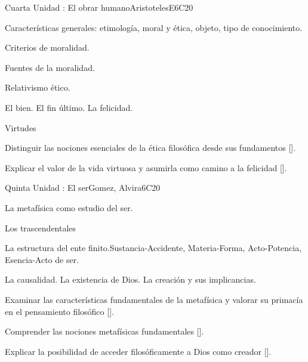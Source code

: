\begin{syllabus}
\begin{unit}{}{Cuarta Unidad : El obrar humano}{AristotelesE}{6}{C20}
\begin{topics}
	\item Características generales: etimología, moral y ética, objeto, tipo de conocimiento.
	\item Criterios de moralidad.
	\item Fuentes de la moralidad.
	\item Relativismo ético.
	\item El bien. El fin último. La felicidad.
	\item Virtudes
\end{topics}
\begin{learningoutcomes}
	\item Distinguir las nociones esenciales de la ética filosófica desde sus fundamentos [\Usage].
    \item Explicar el valor de la vida virtuosa y asumirla como camino a la felicidad [\Usage].
\end{learningoutcomes}
\end{unit}

\begin{unit}{}{Quinta Unidad : El ser}{Gomez, Alvira}{6}{C20}
\begin{topics}
	\item La metafísica como estudio del ser.
	\item Los trascendentales
	\item La estructura del ente finito.Sustancia-Accidente, Materia-Forma, Acto-Potencia, Esencia-Acto de ser.
	\item La causalidad. La existencia de Dios. La creación y sus implicancias.
\end{topics}
\begin{learningoutcomes}
	\item Examinar las características fundamentales de la metafísica y valorar su primacía en el pensamiento filosófico [\Usage].
    \item Comprender las nociones metafísicas fundamentales [\Usage].
    \item Explicar la posibilidad de acceder filosóficamente a Dios como creador [\Usage].
\end{learningoutcomes}
\end{unit}



\begin{coursebibliography}
\end{coursebibliography}

\end{syllabus}
